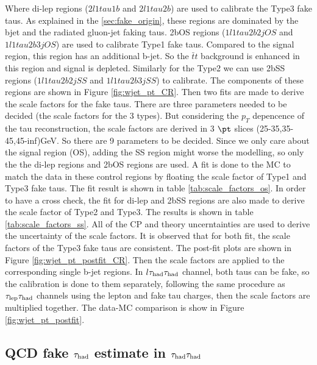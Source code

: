Where di-lep regions ($2l1tau1b$ and $2l1tau2b$) are used to calibrate the Type3 fake taus. As explained in the \ref{sec:fake_origin}, these regions are dominated by the bjet and the radiated gluon-jet faking taus. 2bOS regions ($1l1tau2b2j OS$ and $1l1tau2b3j OS$) are used to calibrate Type1 fake taus. Compared to the signal region, this region has an additional b-jet. So the $\bar{t}t$ background is enhanced in this region and signal is depleted. Similarly for the Type2 we can use 2bSS regions ($1l1tau2b2j SS$ and $1l1tau2b3j SS$) to calibrate. The components of these regions are shown in Figure \ref{fig:wjet_pt_CR}. Then two fits are made to derive the scale factors for the fake taus. There are three parameters needed to be decided (the scale factors for the 3 types). But considering the $p_{T}$ depencence of the tau reconstruction, the scale factors are derived in 3 $\pt$ slices (25-35,35-45,45-inf)GeV. So there are 9 parameters to be decided. Since we only care about the signal region (OS), adding the SS region might worse the modelling, so only the the di-lep regions and 2bOS regions are used. A fit is done to the MC to match the data in these control regions by floating the scale factor of Type1 and Type3 fake taus. The fit result is shown in table \ref{tab:scale_factors_os}. In order to have a cross check, the fit for di-lep and 2bSS regions are also made to derive the scale factor of Type2 and Type3. The results is shown in table \ref{tab:scale_factors_ss}. All of the CP and theory uncerntainties are used to derive the uncertainty of the scale factors. It is observed that for both fit, the scale factors of the Type3 fake taus are consistent. The post-fit plots are shown in Figure \ref{fig:wjet_pt_postfit_CR}. Then the scale factors are applied to the corresponding single b-jet regions. In $l\tau_\text{had}{}\tau_\text{had}$ channel, both taus can be fake, so the calibration is done to them separately, following the same procedure as $\tau_\text{lep}{}\tau_\text{had}$ channels using the lepton and fake tau charges, then the scale factors are multiplied together. The data-MC comparison is show in Figure \ref{fig:wjet_pt_postfit}.









\subsection{QCD fake $\tau_\text{had}$ estimate in $\tau_\text{had}{}\tau_\text{had}$}
\label{sec:ss_method}

